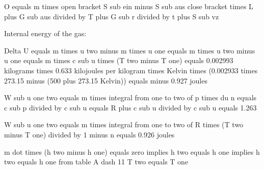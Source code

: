 O equals m times open bracket S sub ein minus S sub aus close bracket times L plus G sub aus divided by T plus G sub r divided by t plus S sub vz

Internal energy of the gas:

Delta U equals m times u two minus m times u one  
equals m times u two minus u one  
equals m times c sub u times (T two minus T one)  
equals 0.002993 kilograms times 0.633 kilojoules per kilogram times Kelvin times (0.002933 times 273.15 minus (500 plus 273.15 Kelvin))  
equals minus 0.927 joules

W sub u one two equals m times integral from one to two of p times du  
n equals c sub p divided by c sub u equals R plus c sub u divided by c sub u  
equals 1.263

W sub u one two equals m times integral from one to two of R times (T two minus T one) divided by 1 minus n  
equals 0.926 joules

m dot times (h two minus h one) equals zero  
implies h two equals h one  
implies h two equals h one from table A dash 11  
T two equals T one